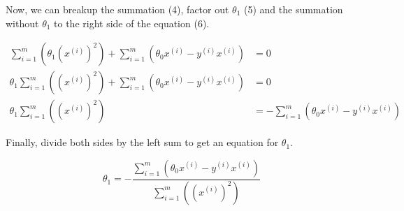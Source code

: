 \documentclass[12pt, a4paper]{article}
\begin{document}
	Now, we can breakup the summation (4), factor out $\theta_1$ (5) and the summation without $\theta_1$ to the right side of the equation (6).
	
	\begin{align}
	\sum\limits_{i=1}^m(\theta_1(x^{(i)})^2 ) + \sum\limits_{i=1}^m(\theta_0x^{(i)} - y^{(i)}x^{(i)}) &= 0\\
	\theta_1\sum\limits_{i=1}^m((x^{(i)})^2 ) + \sum\limits_{i=1}^m(\theta_0x^{(i)} - y^{(i)}x^{(i)}) &= 0\\
	\theta_1\sum\limits_{i=1}^m((x^{(i)})^2 )   &= - \sum\limits_{i=1}^m(\theta_0x^{(i)} - y^{(i)}x^{(i)})
	\end{align}
	
	Finally, divide both sides by the left sum to get an equation for $\theta_1$.
	
	\begin{equation*}
	\theta_1 = -\frac{\sum\limits_{i=1}^m(\theta_0x^{(i)} - y^{(i)}x^{(i)})}{\sum\limits_{i=1}^m((x^{(i)})^2 )}
	\end{equation*}
\end{document}
